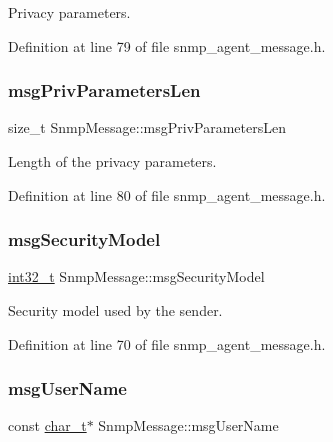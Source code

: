 Privacy parameters. 



Definition at line 79 of file snmp\+\_\+agent\+\_\+message.\+h.

\mbox{\label{structSnmpMessage_afe1bf1cf0a488e38bc8b6017528c35e9}} 
\subsubsection{\texorpdfstring{msg\+Priv\+Parameters\+Len}{msgPrivParametersLen}}
{\footnotesize\ttfamily size\+\_\+t Snmp\+Message\+::msg\+Priv\+Parameters\+Len}



Length of the privacy parameters. 



Definition at line 80 of file snmp\+\_\+agent\+\_\+message.\+h.

\mbox{\label{structSnmpMessage_a868cf2ac7ba0bdb1f756cfaf419cac3c}} 
\subsubsection{\texorpdfstring{msg\+Security\+Model}{msgSecurityModel}}
{\footnotesize\ttfamily \hyperlink{stdint_8h_ab1967d8591af1a4e48c37fd2b0f184d0}{int32\+\_\+t} Snmp\+Message\+::msg\+Security\+Model}



Security model used by the sender. 



Definition at line 70 of file snmp\+\_\+agent\+\_\+message.\+h.

\mbox{\label{structSnmpMessage_a83e0d7035f301d07352eb2d3b6b1679a}} 
\subsubsection{\texorpdfstring{msg\+User\+Name}{msgUserName}}
{\footnotesize\ttfamily const \hyperlink{compiler__port_8h_a40bb5262bf908c328fbcfbe5d29d0201}{char\+\_\+t}$\ast$ Snmp\+Message\+::msg\+User\+Name}




